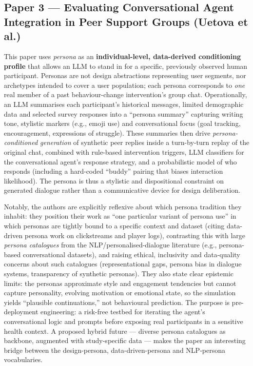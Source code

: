 
\subsection*{Paper 3 --- Evaluating Conversational Agent Integration in Peer Support Groups (Uetova et al.)}

This paper uses \emph{persona} as an \textbf{individual-level, data-derived conditioning profile} that allows an LLM to stand in for a specific, previously observed human participant. Personas are not design abstractions representing user segments, nor archetypes intended to cover a user population; each persona corresponds to \emph{one} real member of a past behaviour-change intervention's group chat. Operationally, an LLM summarises each participant's historical messages, limited demographic data and selected survey responses into a ``persona summary'' capturing writing tone, stylistic markers (e.g., emoji use) and conversational focus (goal tracking, encouragement, expressions of struggle). These summaries then drive \emph{persona-conditioned generation} of synthetic peer replies inside a turn-by-turn replay of the original chat, combined with rule-based intervention triggers, LLM classifiers for the conversational agent's response strategy, and a probabilistic model of who responds (including a hard-coded ``buddy'' pairing that biases interaction likelihood). The persona is thus a stylistic and dispositional constraint on generated dialogue rather than a communicative device for design deliberation.

Notably, the authors are explicitly reflexive about which persona tradition they inhabit: they position their work as ``one particular variant of persona use'' in which personas are tightly bound to a specific context and dataset (citing data-driven persona work on clickstreams and player logs), contrasting this with large \emph{persona catalogues} from the NLP/personalised-dialogue literature (e.g., persona-based conversational datasets), and raising ethical, inclusivity and data-quality concerns about such catalogues (representational gaps, persona bias in dialogue systems, transparency of synthetic personas). They also state clear epistemic limits: the personas approximate style and engagement tendencies but cannot capture personality, evolving motivation or emotional state, so the simulation yields ``plausible continuations,'' not behavioural prediction. The purpose is pre-deployment engineering: a risk-free testbed for iterating the agent's conversational logic and prompts before exposing real participants in a sensitive health context. A proposed hybrid future --- diverse persona catalogues as backbone, augmented with study-specific data --- makes the paper an interesting bridge between the design-persona, data-driven-persona and NLP-persona vocabularies.

